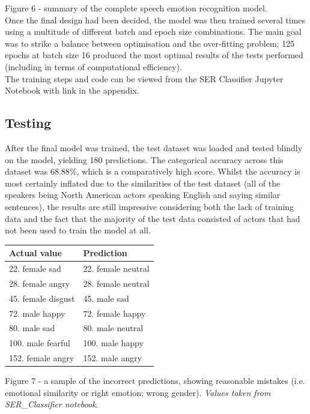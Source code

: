 \documentclass[12pt]{article}
\begin{document}
Figure 6 - summary of the complete speech emotion recognition model.
\\

\noindent Once the final design had been decided, the model was then trained several times using a multitude of different batch and epoch size combinations. The main goal was to strike a balance between optimisation and the over-fitting problem; 125 epochs at batch size 16 produced the most optimal results of the tests performed (including in terms of computational efficiency).
\\

\noindent The training steps and code can be viewed from the SER Classifier Jupyter Notebook with link in the appendix.
\subsection{Testing}
After the final model was trained, the test dataset was loaded and tested blindly on the model, yielding 180 predictions. The categorical accuracy across this dataset was 68.88\%, which is a comparatively high score. Whilst the accuracy is most certainly inflated due to the similarities of the test dataset (all of the speakers being North American actors speaking English and saying similar sentences), the results are still impressive considering both the lack of training data and the fact that the majority of the test data consisted of actors that had not been used to train the model at all. 
\begin{center}
\begin{tabularx}{\textwidth}{ |X|X| }
\hline 
  \textbf{Actual value} & \textbf{Prediction} \\
  \hline
  22. female sad & 22. female neutral \\
  \hline
  28. female angry & 28. female neutral \\
  \hline
  45. female disgust & 45. male sad \\
  \hline
  72. male happy & 72. female happy \\
  \hline
  80. male sad & 80. male neutral \\
  \hline
  100. male fearful & 100. male happy \\
  \hline
  152. female angry & 152. male angry \\
  \hline
\end{tabularx}
\end{center}
Figure 7 - a sample of the incorrect predictions, showing reasonable mistakes (i.e. emotional similarity or right emotion; wrong gender). \textit{Values taken from SER\_Classifier notebook}.
\end{document}
